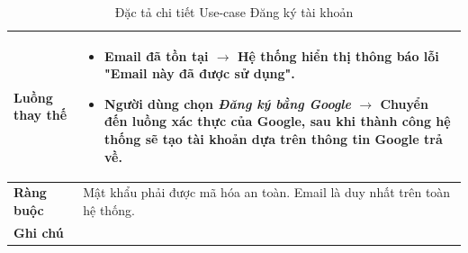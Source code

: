 \begin{table}[H]
\begin{tabular}{|p{4cm}|p{10cm}|}
\textbf{Luồng thay thế} 
& 
\begin{itemize}
    \item Email đã tồn tại $\rightarrow$ Hệ thống hiển thị thông báo lỗi "Email này đã được sử dụng".
    \item Người dùng chọn \textit{Đăng ký bằng Google} $\rightarrow$ Chuyển đến luồng xác thực của Google, sau khi thành công hệ thống sẽ tạo tài khoản dựa trên thông tin Google trả về.
\end{itemize} \\ 
\hline

\textbf{Ràng buộc} 
& Mật khẩu phải được mã hóa an toàn. Email là duy nhất trên toàn hệ thống. \\ 
\hline

\textbf{Ghi chú} 
 \\ 
\hline
\end{tabular}
\caption{Đặc tả chi tiết Use-case Đăng ký tài khoản}
\label{tab:register-spec}
\end{table}


